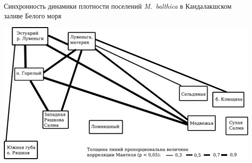 \documentclass{beamer}
\begin{document}
\begin{frame}{Синхронность динамики плотности поселений {\it M.~balthica} в Кандалакшском заливе Белого моря}
		\begin{center}
			\includegraphics[width=\textwidth]{mantel1.pdf}
		\end{center}
\end{frame}
\end{document}
